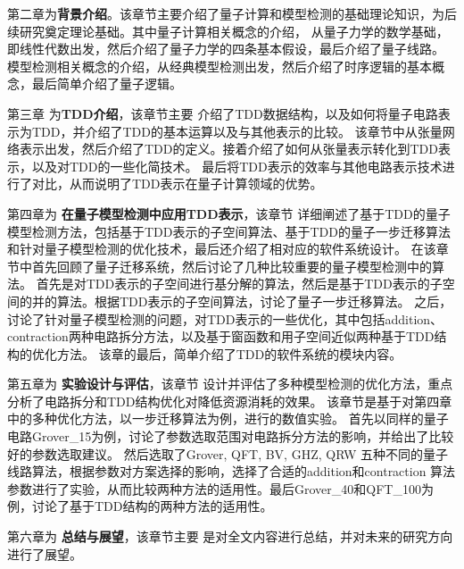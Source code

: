 第二章为\textbf{背景介绍}。该章节主要介绍了量子计算和模型检测的基础理论知识，为后续研究奠定理论基础。其中量子计算相关概念的介绍，
从量子力学的数学基础，即线性代数出发，然后介绍了量子力学的四条基本假设，最后介绍了量子线路。
模型检测相关概念的介绍，从经典模型检测出发，然后介绍了时序逻辑的基本概念，最后简单介绍了量子逻辑。

第三章 为\textbf{TDD介绍}，该章节主要
介绍了TDD数据结构，以及如何将量子电路表示为TDD，并介绍了TDD的基本运算以及与其他表示的比较。
该章节中从张量网络表示出发，然后介绍了TDD的定义。接着介绍了如何从张量表示转化到TDD表示，以及对TDD的一些化简技术。
最后将TDD表示的效率与其他电路表示技术进行了对比，从而说明了TDD表示在量子计算领域的优势。

第四章为 \textbf{在量子模型检测中应用TDD表示}，该章节
详细阐述了基于TDD的量子模型检测方法，包括基于TDD表示的子空间算法、基于TDD的量子一步迁移算法和针对量子模型检测的优化技术，最后还介绍了相对应的软件系统设计。
在该章节中首先回顾了量子迁移系统，然后讨论了几种比较重要的量子模型检测中的算法。
首先是对TDD表示的子空间进行基分解的算法，然后是基于TDD表示的子空间的并的算法。根据TDD表示的子空间算法，讨论了量子一步迁移算法。
之后，讨论了针对量子模型检测的问题，对TDD表示的一些优化，其中包括addition、contraction两种电路拆分方法，以及基于窗函数和用子空间近似两种基于TDD结构的优化方法。
该章的最后，简单介绍了TDD的软件系统的模块内容。


第五章为 \textbf{实验设计与评估}，该章节
设计并评估了多种模型检测的优化方法，重点分析了电路拆分和TDD结构优化对降低资源消耗的效果。
该章节是基于对第四章中的多种优化方法，以一步迁移算法为例，进行的数值实验。
首先以同样的量子电路Grover\_15为例，讨论了参数选取范围对电路拆分方法的影响，并给出了比较好的参数选取建议。
然后选取了Grover, QFT, BV, GHZ, QRW
五种不同的量子线路算法，根据参数对方案选择的影响，选择了合适的addition和contraction
算法参数进行了实验，从而比较两种方法的适用性。最后Grover\_40和QFT\_100为例，讨论了基于TDD结构的两种方法的适用性。

第六章为 \textbf{总结与展望}，该章节主要
是对全文内容进行总结，并对未来的研究方向进行了展望。